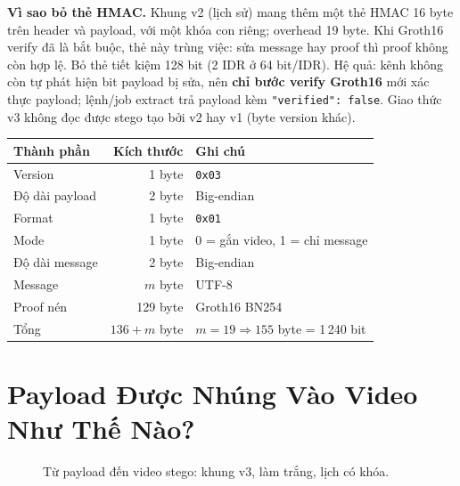 \documentclass[11pt,a4paper]{article}
\begin{document}
\textbf{Vì sao bỏ thẻ HMAC.} Khung v2 (lịch sử) mang thêm một thẻ HMAC
16 byte trên header và payload, với một khóa con riêng; overhead 19 byte. Khi Groth16 verify đã là bắt buộc, thẻ này trùng việc: sửa message hay proof
thì proof không còn hợp lệ. Bỏ thẻ tiết kiệm 128 bit (2 IDR ở 64 bit/IDR). Hệ quả: kênh
không còn tự phát hiện bit payload bị sửa, nên \textbf{chỉ bước verify Groth16} mới
xác thực payload; lệnh/job extract trả payload kèm \texttt{"verified": false}. Giao
thức v3 không đọc được stego tạo bởi v2 hay v1 (byte version khác).

\begin{center}
\begin{tabular}{lrl}
\toprule
Thành phần & Kích thước & Ghi chú \\
\midrule
Version & 1 byte & \texttt{0x03} \\
Độ dài payload & 2 byte & Big-endian \\
\quad Format & 1 byte & \texttt{0x01} \\
\quad Mode & 1 byte & 0 = gắn video, 1 = chỉ message \\
\quad Độ dài message & 2 byte & Big-endian \\
\quad Message & \(m\) byte & UTF-8 \\
\quad Proof nén & 129 byte & Groth16 BN254 \\
\midrule
Tổng & \(136 + m\) byte & \(m = 19 \Rightarrow 155\) byte = 1\,240 bit \\
\bottomrule
\end{tabular}
\end{center}

\section{Payload Được Nhúng Vào Video Như Thế Nào?}

\begin{figure}[H]
\centering
{}
\caption{Từ payload đến video stego: khung v3, làm trắng, lịch có khóa.}
\label{fig:embed-bits}
\end{figure}
\end{document}
